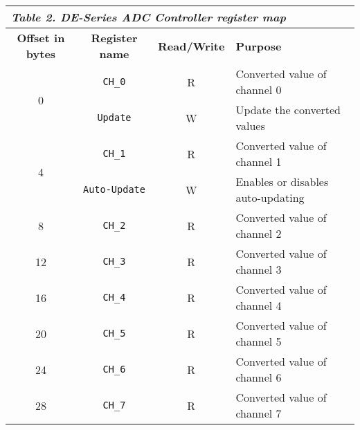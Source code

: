 \begin{table}[h]

    \centering
    \begin{tabular}{|c|c|c|p{7cm}|}
        \hline
        \multicolumn{4}{|l|}{\textit{\textbf{Table 2. DE-Series ADC Controller register map}}}
        \\\hline
            \textbf{Offset in bytes}
            & \textbf{Register name}
            & \textbf{Read/Write}
            & \textbf{Purpose}
        \\\hline
        \multirow{2}{*}{0} 
            & \texttt {CH\_0} & R & Converted value of channel 0
        \\\cline{2-4}
            & \texttt {Update} & W & Update the converted values
        \\\hline
        \multirow{2}{*}{4} 
            & \texttt {CH\_1} & R & Converted value of channel 1
        \\\cline{2-4}
            & \texttt {Auto-Update} & W & Enables or disables auto-updating
        \\\hline
            8
            & \texttt{CH\_2}
            & R
            & Converted value of channel 2
        \\\hline
            12
            & \texttt{CH\_3}
            & R
            & Converted value of channel 3
        \\\hline
            16
            & \texttt{CH\_4}
            & R
            & Converted value of channel 4
        \\\hline
            20
            &\texttt{CH\_5}
            & R
            & Converted value of channel 5
        \\\hline
            24
            & \texttt{CH\_6}
            & R
            & Converted value of channel 6
        \\\hline
            28
            & \texttt{CH\_7}
            & R
            & Converted value of channel 7
        \\\hline
    \end{tabular}
    \label{tab:regfiles}
\end{table}